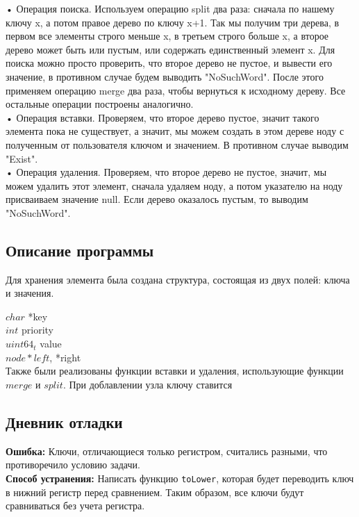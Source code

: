 \documentclass[12pt]{article}
\begin{document}
• Операция поиска. Используем операцию split два раза: сначала по нашему ключу
x, а потом правое дерево по ключу x+1. Так мы получим три дерева, в первом все
элементы строго меньше x, в третьем строго больше x, а второе дерево может быть
или пустым, или содержать единственный элемент x. Для поиска можно просто
проверить, что второе дерево не пустое, и вывести его значение, в противном
случае будем выводить "NoSuchWord". После этого применяем операцию merge
два раза, чтобы вернуться к исходному дереву. Все остальные операции построены
аналогично. \\
• Операция вставки. Проверяем, что второе дерево пустое, значит такого элемента
пока не существует, а значит, мы можем создать в этом дереве ноду с полученным
от пользователя ключом и значением. В противном случае выводим "Exist".\\
• Операция удаления. Проверяем, что второе дерево не пустое, значит, мы можем
удалить этот элемент, сначала удаляем ноду, а потом указателю на ноду присваиваем
значение null. Если дерево оказалось пустым, то выводим "NoSuchWord".\\


\subsection*{Описание программы}

Для хранения элемента была создана структура, состоящая из двух полей: ключа и значения.

$char$ *key\\
$int$ priority\\
$uint64_t$ value\\
$node *left$, *right\\

Также были реализованы функции вставки и удаления, использующие функции $merge$ и $split$.
При доблавлении узла ключу ставится 


\subsection*{Дневник отладки}

\textbf{Ошибка:} Ключи, отличающиеся только регистром, считались разными, что противоречило условию задачи. \\


\textbf{Способ устранения:} Написать функцию \texttt{toLower}, которая будет переводить ключ в нижний регистр перед сравнением. Таким образом, все ключи будут сравниваться без учета регистра.
\end{document}
